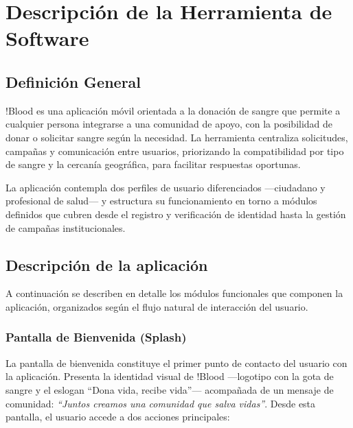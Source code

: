 \section{Descripción de la Herramienta de Software}

\subsection{Definición General}

!Blood es una aplicación móvil orientada a la donación de sangre que permite a cualquier persona integrarse a una comunidad de apoyo, con la posibilidad de donar o solicitar sangre según la necesidad. La herramienta centraliza solicitudes, campañas y comunicación entre usuarios, priorizando la compatibilidad por tipo de sangre y la cercanía geográfica, para facilitar respuestas oportunas.

La aplicación contempla dos perfiles de usuario diferenciados ---ciudadano y profesional de salud--- y estructura su funcionamiento en torno a módulos definidos que cubren desde el registro y verificación de identidad hasta la gestión de campañas institucionales.

\subsection{Descripción de la aplicación}

A continuación se describen en detalle los módulos funcionales que componen la aplicación, organizados según el flujo natural de interacción del usuario.

\subsubsection{Pantalla de Bienvenida (Splash)}

La pantalla de bienvenida constituye el primer punto de contacto del usuario con la aplicación. Presenta la identidad visual de !Blood ---logotipo con la gota de sangre y el eslogan ``Dona vida, recibe vida''--- acompañada de un mensaje de comunidad: \textit{``Juntos creamos una comunidad que salva vidas''}. Desde esta pantalla, el usuario accede a dos acciones principales:

